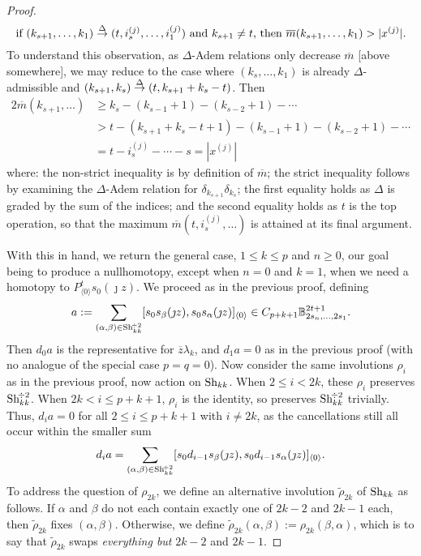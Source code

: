 \documentclass[11pt]{amsart}
\theoremstyle{plain}
\theoremstyle{definition}
\theoremstyle{plain}
\newcommand{\deltaalg}{\Delta} %
\newcommand{\minDimP}{\overline{m}}
\newcommand{\produces}[3]{#3:#1\sim #2}
\renewcommand{\produces}[3]{#1\rightarrow_{#3} #2}%
\renewcommand{\produces}[3]{#1\overset{\smash{#3}}{\rightarrow} #2}%
\newcommand{\Shuffles}[2]{\textup{Sh}_{#1#2}}
\newcommand{\HalfShuffles}[2]{\textup{Sh}_{#1#2}^{\smash{\!\div2}}}
\begin{document}
\begin{Koszul complexes}
\begin{proof}
\[\textup{if }\produces{(k_{s+1},\ldots,k_1)}{(t,i_{s}^{(j)},\ldots,i_1^{(j)})}{\deltaalg}\textup{ and }k_{s+1}\neq t\textup{, then }\minDimP(k_{s+1},\ldots,k_1)>|x^{(j)}|.\]
To understand this observation, as $\deltaalg$-Adem relations only decrease $\minDimP$ [above somewhere], we may reduce to the case where $(k_s,\ldots,k_1)$ is already $\deltaalg$-admissible and $\produces{(k_{s+1},k_{s})}{(t,k_{s+1}+k_{s}-t)}{\deltaalg}$. Then
\begin{alignat*}{2}
\minDimP(k_{s+1},\ldots)&\geq k_{s}-(k_{s-1}+1)-(k_{s-2}+1)-\cdots  \\
&> t-(k_{s+1}+k_s-t+1)-(k_{s-1}+1)-(k_{s-2}+1)-\cdots  \\
&=t-i^{(j)}_{s}-\cdots -s=|x^{(j)}|
\end{alignat*}
where: the non-strict inequality is by definition of $\minDimP$; the strict inequality follows by examining the $\deltaalg$-Adem relation for $\delta_{k_{s+1}}\delta_{k_{s}}$; the first equality holds as $\deltaalg$ is graded by the sum of the indices; and the second equality holds as $t$ is the top operation, so that the maximum $\minDimP(t,i^{(j)}_{s},\ldots)$ is attained at its final argument.

With this in hand, we return the general case, $1\leq k\leq p$ and $n\geq0$, our goal being to produce a nullhomotopy, except when $n=0$ and $k=1$, when we need a homotopy to $P^t_{\langle 0\rangle}s_0(\jmath z)$. We proceed as in the previous proof, defining
\[a:=\sum_{(\alpha,\beta)\in\HalfShuffles{k}{k}}[s_{0}s_\beta(\jmath z), s_{0}s_\alpha(\jmath z)]_{\langle 0\rangle}\in C_{p+k+1}\mathbb{B}_{2s_n,\ldots,2s_1}^{2t+1}.\]
Then $d_0a$ is the representative for $\overline{z}\lambda_k$, and $d_1a=0$ as in the previous proof (with no analogue of the special case $p=q=0$). Now consider the same involutions $\rho_i$ as in the previous proof, now action on $\Shuffles{k}{k}$. When $2\leq i< 2k$, these $\rho_i$ preserves $\HalfShuffles{k}{k}$. When $2k<i\leq p+k+1$, $\rho_i$ is the identity, so preserves $\HalfShuffles{k}{k}$ trivially. Thus, $d_ia=0$ for all $2\leq i\leq p+k+1$ with $i\neq2k$, as  the cancellations still all occur within the smaller sum
\[d_{i}a=\sum_{(\alpha,\beta)\in\HalfShuffles{k}{k}} [s_{0}d_{i-1}s_\beta(\jmath z), s_{0}d_{i-1}s_\alpha(\jmath z)]_{\langle 0\rangle}.\]
To address the question of $\rho_{2k}$, we define an alternative involution $\widetilde{\rho}_{2k}$ of $\Shuffles{k}{k}$ as follows.  If $\alpha$ and $\beta$ do not each contain exactly one of $2k-2$ and $2k-1$ each, then $\widetilde{\rho}_{2k}$ fixes $(\alpha,\beta)$. Otherwise, we define $\widetilde{\rho}_{2k}(\alpha,\beta):=\rho_{2k}(\beta,\alpha)$, which is to say that $\widetilde{\rho}_{2k}$ swaps \emph{everything but} $2k-2$ and $2k-1$.


\end{proof}
\end{Koszul complexes}
\end{document}
